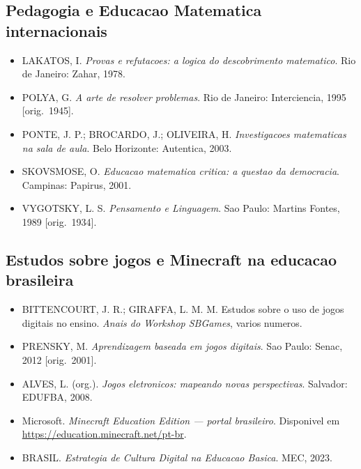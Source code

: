 \documentclass[12pt,a4paper]{scrartcl}
\begin{document}
\subsection{Pedagogia e Educacao Matematica internacionais}
\begin{itemize}[leftmargin=1.3em,itemsep=0.15em,topsep=0.3em]
  \item LAKATOS, I. \emph{Provas e refutacoes: a logica do descobrimento matematico}. Rio de Janeiro: Zahar, 1978.
  \item POLYA, G. \emph{A arte de resolver problemas}. Rio de Janeiro: Interciencia, 1995 [orig.~1945].
  \item PONTE, J. P.; BROCARDO, J.; OLIVEIRA, H. \emph{Investigacoes matematicas na sala de aula}. Belo Horizonte: Autentica, 2003.
  \item SKOVSMOSE, O. \emph{Educacao matematica critica: a questao da democracia}. Campinas: Papirus, 2001.
  \item VYGOTSKY, L. S. \emph{Pensamento e Linguagem}. Sao Paulo: Martins Fontes, 1989 [orig.~1934].
\end{itemize}

\subsection{Estudos sobre jogos e Minecraft na educacao brasileira}
\begin{itemize}[leftmargin=1.3em,itemsep=0.15em,topsep=0.3em]
  \item BITTENCOURT, J. R.; GIRAFFA, L. M. M. Estudos sobre o uso de jogos digitais no ensino. \emph{Anais do Workshop SBGames}, varios numeros.
  \item PRENSKY, M. \emph{Aprendizagem baseada em jogos digitais}. Sao Paulo: Senac, 2012 [orig.~2001].
  \item ALVES, L. (org.). \emph{Jogos eletronicos: mapeando novas perspectivas}. Salvador: EDUFBA, 2008.
  \item Microsoft. \emph{Minecraft Education Edition --- portal brasileiro}. Disponivel em \url{https://education.minecraft.net/pt-br}.
  \item BRASIL. \emph{Estrategia de Cultura Digital na Educacao Basica}. MEC, 2023.
\end{itemize}
\end{document}
